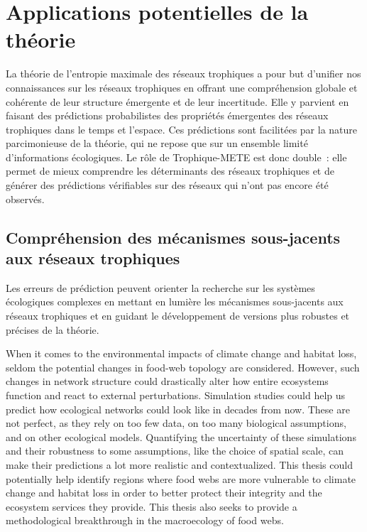
\section{Applications potentielles de la théorie} 

La théorie de l'entropie maximale des réseaux trophiques a pour but d'unifier
nos connaissances sur les réseaux trophiques en offrant une compréhension
globale et cohérente de leur structure émergente et de leur incertitude. Elle y
parvient en faisant des prédictions probabilistes des propriétés émergentes des
réseaux trophiques dans le temps et l'espace. Ces prédictions sont facilitées
par la nature parcimonieuse de la théorie, qui ne repose que sur un ensemble
limité d'informations écologiques. Le rôle de Trophique-METE est donc double~:
elle permet de mieux comprendre les déterminants des réseaux trophiques et de
générer des prédictions vérifiables sur des réseaux qui n'ont pas encore été
observés.

\subsection{Compréhension des mécanismes sous-jacents aux réseaux trophiques} 

Les erreurs de prédiction peuvent orienter
la recherche sur les systèmes écologiques complexes en mettant en lumière les
mécanismes sous-jacents aux réseaux trophiques et en guidant le développement de
versions plus robustes et précises de la théorie.

When it comes to the environmental impacts of climate change and
habitat loss, seldom the potential changes in food-web topology are considered.
However, such changes in network structure could drastically alter how entire
ecosystems function and react to external perturbations. Simulation studies
could help us predict how ecological networks could look like in decades from
now. These are not perfect, as they rely on too few data, on too many biological
assumptions, and on other ecological models. Quantifying the uncertainty of
these simulations and their robustness to some assumptions, like the choice of
spatial scale, can make their predictions a lot more realistic and
contextualized. This thesis could potentially help identify regions where food
webs are more vulnerable to climate change and habitat loss in order to better
protect their integrity and the ecosystem services they provide. This thesis
also seeks to provide a methodological breakthrough in the macroecology of food
webs.

